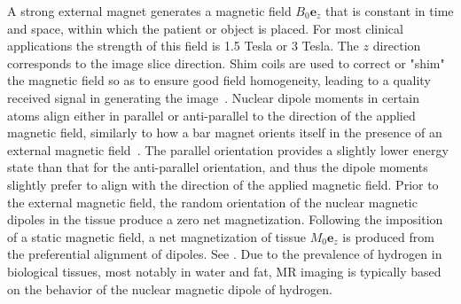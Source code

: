 A strong external magnet generates a magnetic field $B_0\bm{e}_z$ that is constant in time and space, within which the patient or object is placed. For most clinical applications the strength of this field is 1.5 Tesla or 3 Tesla. The $z$ direction corresponds to the image slice direction. Shim coils are used to correct or "shim" the magnetic field so as to ensure good field homogeneity, leading to a quality received signal in generating the image~\cite{jacobs_2007}. Nuclear dipole moments in certain atoms align either in parallel or anti-parallel to the direction of the applied magnetic field, similarly to how a bar magnet orients itself in the presence of an external magnetic field~\cite{hendrick_1994}. The parallel orientation provides a slightly lower energy state than that for the anti-parallel orientation, and thus the dipole moments slightly prefer to align with the direction of the applied magnetic field. Prior to the external magnetic field, the random orientation of the nuclear magnetic dipoles in the tissue produce a zero net magnetization. Following the imposition of a static magnetic field, a net magnetization of tissue $M_0\bm{e}_z$ is produced from the preferential alignment of dipoles. See . Due to the prevalence of hydrogen in biological tissues, most notably in water and fat, MR imaging is typically based on the behavior of the nuclear magnetic dipole of hydrogen.
